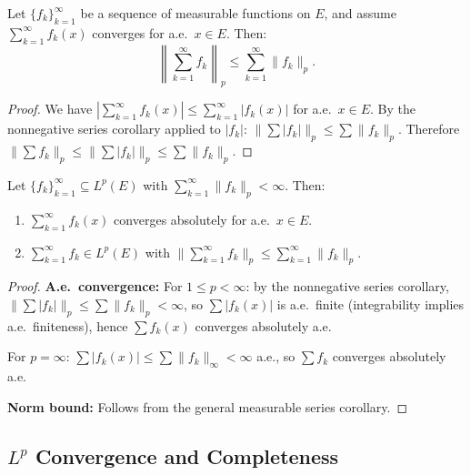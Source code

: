 \documentclass[11pt]{report}
\begin{document}
\begin{corbox}
Let $\{f_k\}_{k=1}^{\infty}$ be a sequence of measurable functions on $E$, and assume $\sum_{k=1}^{\infty} f_k(x)$ converges for a.e.\ $x \in E$. Then:
\[
\left\|\sum_{k=1}^{\infty} f_k\right\|_p \leq \sum_{k=1}^{\infty} \|f_k\|_p.
\]
\end{corbox}

\begin{proof}
We have $|\sum_{k=1}^{\infty} f_k(x)| \leq \sum_{k=1}^{\infty} |f_k(x)|$ for a.e.\ $x \in E$. By the nonnegative series corollary applied to $|f_k|$: $\|\sum |f_k|\|_p \leq \sum \|f_k\|_p$. Therefore $\|\sum f_k\|_p \leq \|\sum |f_k|\|_p \leq \sum \|f_k\|_p$.
\end{proof}

\begin{corbox}
Let $\{f_k\}_{k=1}^{\infty} \subseteq L^p(E)$ with $\sum_{k=1}^{\infty} \|f_k\|_p < \infty$. Then:
\begin{enumerate}[label=(\roman*)]
\item $\sum_{k=1}^{\infty} f_k(x)$ converges absolutely for a.e.\ $x \in E$.
\item $\sum_{k=1}^{\infty} f_k \in L^p(E)$ with $\|\sum_{k=1}^{\infty} f_k\|_p \leq \sum_{k=1}^{\infty} \|f_k\|_p$.
\end{enumerate}
\end{corbox}

\begin{proof}\leavevmode

\textbf{A.e.\ convergence:} For $1 \leq p < \infty$: by the nonnegative series corollary, $\|\sum |f_k|\|_p \leq \sum \|f_k\|_p < \infty$, so $\sum |f_k(x)|$ is a.e.\ finite (integrability implies a.e.\ finiteness), hence $\sum f_k(x)$ converges absolutely a.e.

For $p = \infty$: $\sum |f_k(x)| \leq \sum \|f_k\|_\infty < \infty$ a.e., so $\sum f_k$ converges absolutely a.e.

\textbf{Norm bound:} Follows from the general measurable series corollary.
\end{proof}

\subsection{$L^p$ Convergence and Completeness}
\end{document}
